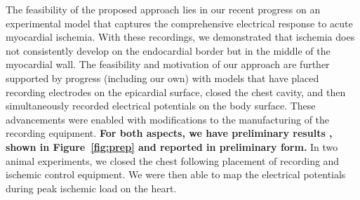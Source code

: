 The feasibility of the proposed approach lies in our recent progress on an
experimental model that captures the comprehensive electrical response to
acute myocardial
ischemia.\cite{BMB:Ara2009,KKA:Ara2014,RSM:Ara2016,BLZ:Zen2018a}
With these recordings, we demonstrated that ischemia does not consistently
develop on the endocardial border but in the middle of the myocardial
wall.\cite{RSM:Ara2016}
The feasibility and motivation of our approach are further supported by
progress (including our own) with models that have placed recording
electrodes on the epicardial surface, closed the chest cavity, and then
simultaneously recorded electrical potentials on the body
surface.\cite{BLZ:Spa1975,RSM:Bea2015a,BLZ:Clu2017,BLZ:Zen2018a}
These advancements were enabled with modifications to the manufacturing of
the recording equipment. \textbf{For both aspects, we have preliminary
  results , shown in Figure~\ref{fig:prep} and reported in preliminary
  form.}\cite{BLZ:Zen2018a} In two animal experiments, we closed the chest
following placement of recording and ischemic control equipment. We were
then able to map the electrical potentials during peak ischemic load on the
heart.




